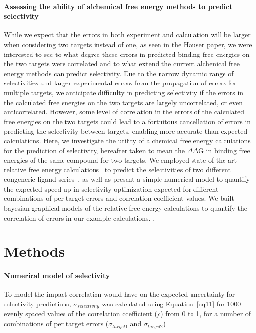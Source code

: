 \documentclass[9pt,lineno]{elife-modified} %
\begin{document}
\paragraph{Assessing the ability of alchemical free energy methods to predict selectivity}
While we expect that the errors in both experiment and calculation will be larger when considering two targets instead of one, as seen in the Hauser paper, we were interested to see to what degree these errors in predicted binding free energies on the two targets were correlated and to what extend the current alchenical free energy methods can predict selectivity. Due to the narrow dynamic range of selectivities and larger experimental errors from the propagation of errors for multiple targets, we anticipate difficulty in predicting selectivity if the errors in the calculated free energies on the two targets are largely uncorrelated, or even anticorrelated. However, some level of correlation in the errors of the calculated free energies on the two targets could lead to a fortuitous cancellation of errors in predicting the selectivity between targets, enabling more accurate than expected calculations. 
Here, we investigate the utility of alchemical free energy calculations for the prediction of selectivity, hereafter taken to mean the $\Delta \Delta$G in binding free energies of the same compound for two targets. We employed state of the art relative free energy calculations~\citep{Wang:J.Am.Chem.Soc.:2015,Abel:2017jt} to predict the selectivities of two different congeneric ligand series~\citep{Shao2013-oe, Blake2016-su}, as well as present a simple numerical model to quantify the expected speed up in selectivity optimization expected for different combinations of per target errors and correlation coefficient values. We built bayesian graphical models of the relative free energy calculations to quantify the correlation of errors in our example calculations.   . 
   

%
%
%
%
\section{Methods}

\paragraph{Numerical model of selectivity}
To model the impact correlation would have on the expected uncertainty for selectivity predictions, $\sigma_{selectivity}$ was calculated using Equation~\ref{eq11} for 1000 evenly spaced values of the correlation coefficient ($\rho$) from 0 to 1, for a number of combinations of per target errors ($\sigma_{target1}$ and $\sigma_{target2}$) 
\end{document}
